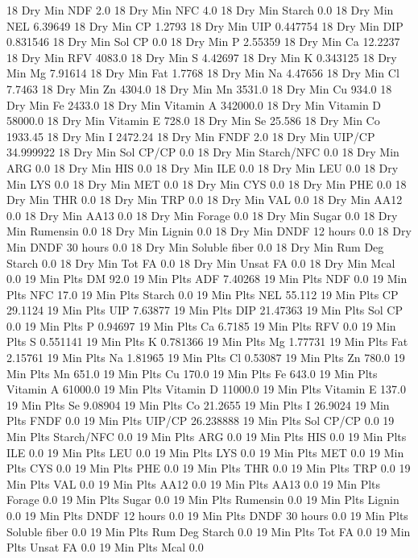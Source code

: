 \documentclass[letterpaper,10pt,english]{sphinxmanual}
\begin{document}
\begin{sphinxVerbatim}[commandchars=\\\{\},numbers=left,firstnumber=1,stepnumber=1]
18 Dry Min NDF 2.0
18 Dry Min NFC 4.0
18 Dry Min Starch 0.0
18 Dry Min NEL 6.39649
18 Dry Min CP 1.2793
18 Dry Min UIP 0.447754
18 Dry Min DIP 0.831546
18 Dry Min Sol CP 0.0
18 Dry Min P 2.55359
18 Dry Min Ca 12.2237
18 Dry Min RFV 4083.0
18 Dry Min S 4.42697
18 Dry Min K 0.343125
18 Dry Min Mg 7.91614
18 Dry Min Fat 1.7768
18 Dry Min Na 4.47656
18 Dry Min Cl 7.7463
18 Dry Min Zn 4304.0
18 Dry Min Mn 3531.0
18 Dry Min Cu 934.0
18 Dry Min Fe 2433.0
18 Dry Min Vitamin A 342000.0
18 Dry Min Vitamin D 58000.0
18 Dry Min Vitamin E 728.0
18 Dry Min Se 25.586
18 Dry Min Co 1933.45
18 Dry Min I 2472.24
18 Dry Min FNDF 2.0
18 Dry Min UIP/CP 34.999922
18 Dry Min Sol CP/CP 0.0
18 Dry Min Starch/NFC 0.0
18 Dry Min ARG 0.0
18 Dry Min HIS 0.0
18 Dry Min ILE 0.0
18 Dry Min LEU 0.0
18 Dry Min LYS 0.0
18 Dry Min MET 0.0
18 Dry Min CYS 0.0
18 Dry Min PHE 0.0
18 Dry Min THR 0.0
18 Dry Min TRP 0.0
18 Dry Min VAL 0.0
18 Dry Min AA\PYGZsh{}12 0.0
18 Dry Min AA\PYGZsh{}13 0.0
18 Dry Min \PYGZpc{} Forage 0.0
18 Dry Min Sugar \PYGZpc{} 0.0
18 Dry Min Rumensin 0.0
18 Dry Min Lignin 0.0
18 Dry Min DNDF 12 hours 0.0
18 Dry Min DNDF 30 hours 0.0
18 Dry Min Soluble fiber 0.0
18 Dry Min Rum Deg Starch 0.0
18 Dry Min Tot FA 0.0
18 Dry Min Unsat FA 0.0
18 Dry Min Mcal 0.0
19 Min Plts DM 92.0
19 Min Plts ADF 7.40268
19 Min Plts NDF 0.0
19 Min Plts NFC 17.0
19 Min Plts Starch 0.0
19 Min Plts NEL 55.112
19 Min Plts CP 29.1124
19 Min Plts UIP 7.63877
19 Min Plts DIP 21.47363
19 Min Plts Sol CP 0.0
19 Min Plts P 0.94697
19 Min Plts Ca 6.7185
19 Min Plts RFV 0.0
19 Min Plts S 0.551141
19 Min Plts K 0.781366
19 Min Plts Mg 1.77731
19 Min Plts Fat 2.15761
19 Min Plts Na 1.81965
19 Min Plts Cl 0.53087
19 Min Plts Zn 780.0
19 Min Plts Mn 651.0
19 Min Plts Cu 170.0
19 Min Plts Fe 643.0
19 Min Plts Vitamin A 61000.0
19 Min Plts Vitamin D 11000.0
19 Min Plts Vitamin E 137.0
19 Min Plts Se 9.08904
19 Min Plts Co 21.2655
19 Min Plts I 26.9024
19 Min Plts FNDF 0.0
19 Min Plts UIP/CP 26.238888
19 Min Plts Sol CP/CP 0.0
19 Min Plts Starch/NFC 0.0
19 Min Plts ARG 0.0
19 Min Plts HIS 0.0
19 Min Plts ILE 0.0
19 Min Plts LEU 0.0
19 Min Plts LYS 0.0
19 Min Plts MET 0.0
19 Min Plts CYS 0.0
19 Min Plts PHE 0.0
19 Min Plts THR 0.0
19 Min Plts TRP 0.0
19 Min Plts VAL 0.0
19 Min Plts AA\PYGZsh{}12 0.0
19 Min Plts AA\PYGZsh{}13 0.0
19 Min Plts \PYGZpc{} Forage 0.0
19 Min Plts Sugar \PYGZpc{} 0.0
19 Min Plts Rumensin 0.0
19 Min Plts Lignin 0.0
19 Min Plts DNDF 12 hours 0.0
19 Min Plts DNDF 30 hours 0.0
19 Min Plts Soluble fiber 0.0
19 Min Plts Rum Deg Starch 0.0
19 Min Plts Tot FA 0.0
19 Min Plts Unsat FA 0.0
19 Min Plts Mcal 0.0

\end{sphinxVerbatim}
\end{document}
